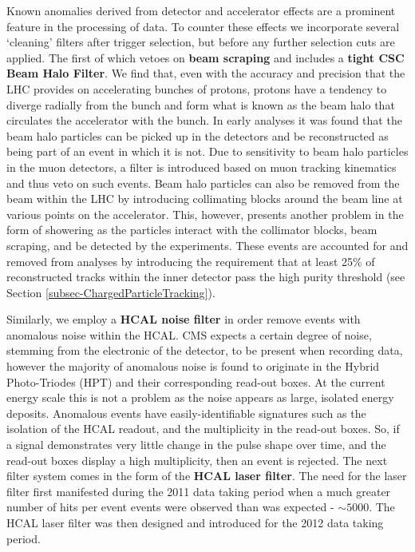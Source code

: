 Known anomalies derived from detector and accelerator effects are a prominent feature in the processing of data. To counter these effects we incorporate several `cleaning' filters after trigger selection, but before any further selection cuts are applied. The first of which vetoes on \textbf{beam scraping} and includes a \textbf{tight CSC Beam Halo Filter}. We find that, even with the accuracy and precision that the LHC provides on accelerating bunches of protons, protons have a tendency to diverge radially from the bunch and form what is known as the beam halo that circulates the accelerator with the bunch. In early analyses it was found that the beam halo particles can be picked up in the detectors and be reconstructed as being part of an event in which it is not. Due to sensitivity to beam halo particles in the muon detectors, a filter is introduced based on muon tracking kinematics and thus veto on such events. Beam halo particles can also be removed from the beam within the LHC by introducing collimating blocks around the beam line at various points on the accelerator. This, however, presents another problem in the form of showering as the particles interact with the collimator blocks, beam scraping, and be detected by the experiments. These events are accounted for and removed from analyses by introducing the requirement that at least 25\% of reconstructed tracks within the inner detector pass the high purity threshold (see Section \ref{subsec-ChargedParticleTracking}). 

Similarly, we employ a \textbf{HCAL noise filter} in order remove events with anomalous noise within the HCAL. CMS expects a certain degree of noise, stemming from the electronic of the detector, to be present when recording data, however the majority of anomalous noise is found to originate in the Hybrid Photo-Triodes (HPT) and their corresponding read-out boxes. At the current energy scale this is not a problem as the noise appears as large, isolated energy deposits. Anomalous events have easily-identifiable signatures such as the isolation of the HCAL readout, and the multiplicity in the read-out boxes. So, if a signal demonstrates very little change in the pulse shape over time, and the read-out boxes display a high multiplicity, then an event is rejected. The next filter system comes in the form of the \textbf{HCAL laser filter}. The need for the laser filter first manifested during the 2011 data taking period when a much greater number of hits per event events were observed than was expected - $\sim5000$. The HCAL laser filter was then designed and introduced for the 2012 data taking period.  

